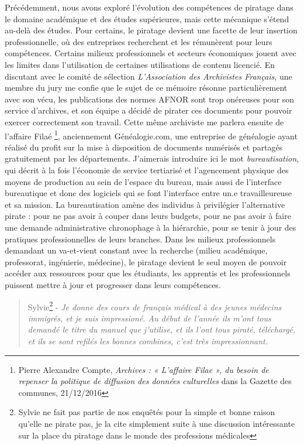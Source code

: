 Précédemment, nous avons exploré l'évolution des compétences de piratage dans le domaine académique et des études supérieures, mais cette mécanique s’étend au-delà des études. Pour certains, le piratage devient une facette de leur insertion professionnelle, où des entreprises recherchent et les rémunèrent pour leurs compétences. Certains milieux professionnels et secteurs économiques jouent avec les limites dans l'utilisation de certaines utilisations de contenu licencié. En discutant avec le comité de sélection \textit{L'Association des Archivistes Français}, une membre du jury me confie que le sujet de ce mémoire résonne particulièrement avec son vécu, les publications des normes AFNOR sont trop onéreuses pour son service d'archives, et son équipe a décidé de pirater ces documents pour pouvoir exercer correctement son travail. Cette même archiviste me parlera ensuite de l'affaire Filaé \footnote{Pierre Alexandre Compte, \textit{Archives : « L’affaire Filae », du besoin de repenser la politique de diffusion des données culturelles} dans la Gazette des communes, 21/12/2016}, anciennement Généalogie.com, une entreprise de généalogie ayant réalisé du profit sur la mise à disposition de documents numérisés et partagés gratuitement par les départements. J'aimerais introduire ici le mot \textit{bureautisation}, qui décrit à la fois l'économie de service tertiarisé et l'agencement physique des moyens de production au sein de l'espace du bureau, mais aussi de l'interface bureautique et donc des logiciels qui se font l'interface entre un.e travailleureuse et sa mission. La bureautisation amène des individus à privilégier l'alternative pirate : pour ne pas avoir à couper dans leurs budgets, pour ne pas avoir à faire une demande administrative chronophage à la hiérarchie, pour se tenir à jour des pratiques professionnelles de leurs branches.
Dans les milieux professionnels demandant un va-et-vient constant avec la recherche (milieu académique, professorat, ingénierie, médecine), le piratage devient le seul moyen de pouvoir accéder aux ressources pour que les étudiants, les apprentis et les professionnels puissent mettre à jour et progresser dans leurs compétences.

\begin{quote}
    Sylvie\footnote{Sylvie ne fait pas partie de nos enquêtés pour la simple et bonne raison qu'elle ne pirate pas, je la cite simplement suite à une discussion intéressante sur la place du piratage dans le monde des professions médicales} - \textit{Je donne des cours de français médical à des jeunes médecins immigrés, et je suis impressioné. Au début de l'année ils m'ont tous demandé le titre du manuel que j'utilise, et ils l'ont tous piraté, téléchargé, et ils se sont refilés les bonnes combines, c'est très impressionnant.}
\end{quote}

